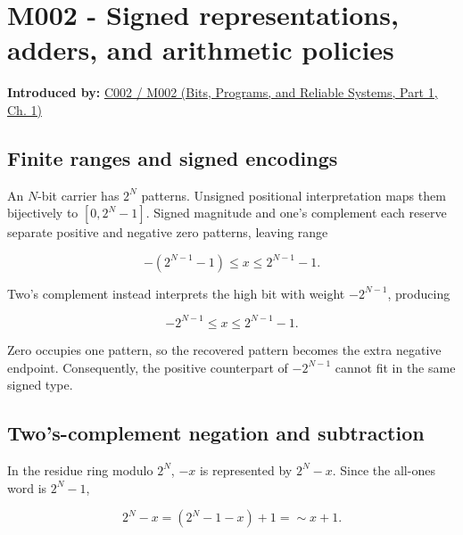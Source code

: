 \section{M002 - Signed representations, adders, and arithmetic policies}\label{03-visual-computing-i-ch018-m002---signed-representations-adders-and-arithmetic-policies}

\hypertarget{03-visual-computing-i-ch018-m002---signed-representations-adders-and-arithmetic-policies}{}

\textbf{Introduced by:} \href{../01-Bits-Programs-and-Reliable-Systems-P01/main.pdf\#01-foundations-i-ch001-arithmetic-becomes-a-policy}{C002 / M002 (Bits, Programs, and Reliable Systems, Part 1, Ch. 1)}

\subsection{Finite ranges and signed encodings}\label{03-visual-computing-i-ch018-finite-ranges-and-signed-encodings}

\hypertarget{03-visual-computing-i-ch018-finite-ranges-and-signed-encodings}{}

An \(N\)-bit carrier has \(2^N\) patterns. Unsigned positional interpretation maps them bijectively to \([0,2^N-1]\). Signed magnitude and one's complement each reserve separate positive and negative zero patterns, leaving range

\[
-(2^{N-1}-1)\le x\le2^{N-1}-1.
\]

Two's complement instead interprets the high bit with weight \(-2^{N-1}\), producing

\[
-2^{N-1}\le x\le2^{N-1}-1.
\]

Zero occupies one pattern, so the recovered pattern becomes the extra negative endpoint. Consequently, the positive counterpart of \(-2^{N-1}\) cannot fit in the same signed type.

\subsection{Two's-complement negation and subtraction}\label{03-visual-computing-i-ch018-twos-complement-negation-and-subtraction}

\hypertarget{03-visual-computing-i-ch018-twos-complement-negation-and-subtraction}{}

In the residue ring modulo \(2^N\), \(-x\) is represented by \(2^N-x\). Since the all-ones word is \(2^N-1\),

\[
2^N-x=(2^N-1-x)+1=\sim x+1.
\]

